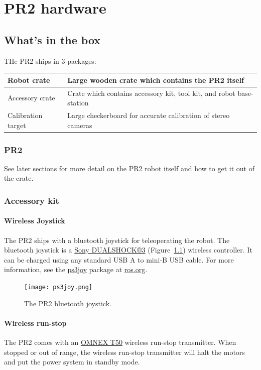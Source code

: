 \chapter{PR2 hardware}

\section{What's in the box}
THe PR2 ships in 3 packages:

\begin{tabular}{| l | l |}
\hline      
  Robot crate & Large wooden crate which contains the PR2 itself \\ \hline
  Accessory crate & Crate which contains accessory kit, tool kit, and robot base-station \\ \hline
  Calibration target & Large checkerboard for accurate calibration of stereo cameras \\ \hline
\end{tabular}

\subsection{PR2}
See later sections for more detail on the PR2 robot itself and how to get it out of the crate.
\subsection{Accessory kit}
\subsubsection{Wireless Joystick}
The PR2 ships with a bluetooth joystick for teleoperating the robot. The bluetooth joystick is a 
\href{http://www.sonystyle.com/webapp/wcs/stores/servlet/ProductDisplay?catalogId=10551&storeId=10151&langId=-1&productId=8198552921665411965#additionalImage1%22}{Sony DUALSHOCK®3} (Figure~\ref{fig:ps3joy}) 
wireless controller. It can be charged using any standard USB A to mini-B USB cable. For more information, see the 
\href{http://www.ros.org/wiki/ps3joy}{ps3joy} package at \href{http://www.ros.org}{ros.org}.

\begin{figure}[h]
\centering
\texttt{[image: ps3joy.png]}
\caption{The PR2 bluetooth joystick.}
\label{fig:ps3joy}
\end{figure}

\subsubsection{Wireless run-stop}
\label{wirelessrunstop}
The PR2 comes with an \href{http://www.omnexcontrols.com/products/portable/t50.html}{OMNEX T50} 
wireless run-stop transmitter. When stopped or out of range, the wireless run-stop transmitter will halt the motors 
and put the power system in standby mode. 

